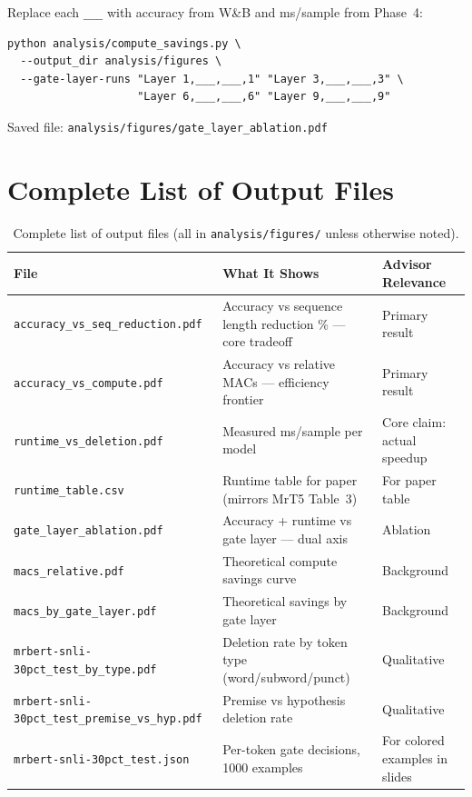 \documentclass[11pt,a4paper]{article}
\newcommand{\tbd}{\textcolor{placeholder}{\texttt{\_\_\_}}}
\begin{document}
Replace each \tbd{} with accuracy from W\&B and ms/sample from Phase~4:

\begin{lstlisting}
python analysis/compute_savings.py \
  --output_dir analysis/figures \
  --gate-layer-runs "Layer 1,___,___,1" "Layer 3,___,___,3" \
                    "Layer 6,___,___,6" "Layer 9,___,___,9"
\end{lstlisting}

Saved file: \texttt{analysis/figures/gate\_layer\_ablation.pdf}


\section{Complete List of Output Files}
\label{sec:output-files}

\begin{table}[h]
\centering
\small
\begin{tabular}{@{}L{6.5cm}L{5cm}L{3cm}@{}}
\toprule
\textbf{File} & \textbf{What It Shows} & \textbf{Advisor Relevance} \\
\midrule
\texttt{accuracy\_vs\_seq\_reduction.pdf}             & Accuracy vs sequence length reduction \% --- core tradeoff              & Primary result \\
\texttt{accuracy\_vs\_compute.pdf}                    & Accuracy vs relative MACs --- efficiency frontier                       & Primary result \\
\texttt{runtime\_vs\_deletion.pdf}                    & Measured ms/sample per model                                            & Core claim: actual speedup \\
\texttt{runtime\_table.csv}                           & Runtime table for paper (mirrors MrT5 Table~3)                          & For paper table \\
\texttt{gate\_layer\_ablation.pdf}                    & Accuracy + runtime vs gate layer --- dual axis                          & Ablation \\
\texttt{macs\_relative.pdf}                           & Theoretical compute savings curve                                       & Background \\
\texttt{macs\_by\_gate\_layer.pdf}                    & Theoretical savings by gate layer                                       & Background \\
\texttt{mrbert-snli-30pct\_test\_by\_type.pdf}        & Deletion rate by token type (word/subword/punct)                        & Qualitative \\
\texttt{mrbert-snli-30pct\_test\_premise\_vs\_hyp.pdf}& Premise vs hypothesis deletion rate                                     & Qualitative \\
\texttt{mrbert-snli-30pct\_test.json}                 & Per-token gate decisions, 1000 examples                                 & For colored examples in slides \\
\bottomrule
\end{tabular}
\caption{Complete list of output files (all in \texttt{analysis/figures/} unless otherwise noted).}
\label{tab:output-files}
\end{table}
\end{document}
